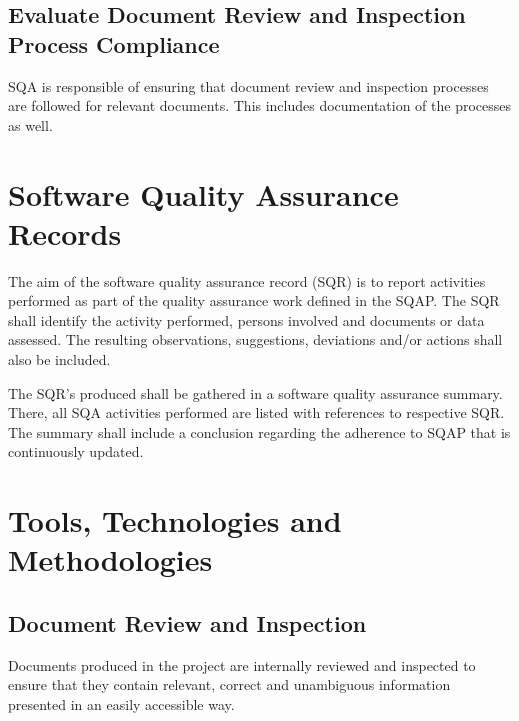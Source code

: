 \documentclass{article}
\begin{document}
	\subsection{Evaluate Document Review and Inspection Process Compliance}
	SQA is responsible of ensuring that document review and inspection processes are followed for relevant documents. This includes documentation of the processes as well. 
	
	
	\clearpage
	
	\section{Software Quality Assurance Records} \label{doc}
	The aim of the software quality assurance record (SQR) is to report activities performed as part of the quality assurance work defined in the SQAP. The SQR shall identify the activity performed, persons involved and documents or data assessed. The resulting observations, suggestions, deviations and/or actions shall also be included. 
	
	The SQR's produced shall be gathered in a software quality assurance summary. There, all SQA activities performed are listed with references to respective SQR. The summary shall include a conclusion regarding the adherence to SQAP that is continuously updated.
	
	
	\clearpage
	\section{Tools, Technologies and Methodologies} \label{method}
	
	\subsection{Document Review and Inspection}
	Documents produced in the project are internally reviewed and inspected to  ensure that they contain relevant, correct and unambiguous information presented in an easily accessible way.  
	
\end{document}
